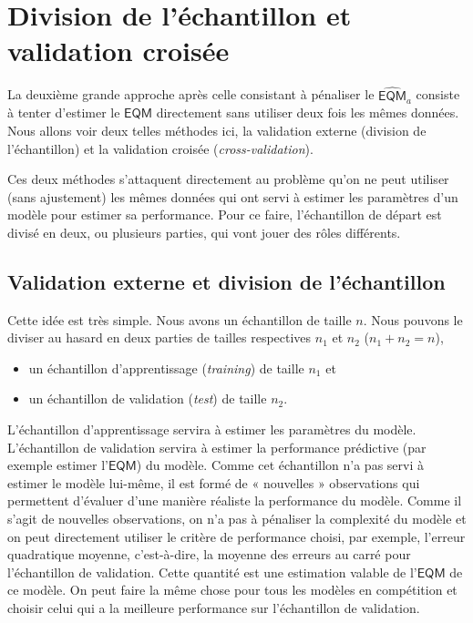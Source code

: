 \documentclass[
  11pt,
  letterpaper,
]{book}
\providecommand{\tightlist}{%
  \setlength{\itemsep}{0pt}\setlength{\parskip}{0pt}}
\theoremstyle{definition}
\theoremstyle{definition}
\theoremstyle{definition}
\theoremstyle{definition}
\theoremstyle{remark}
\begin{document}
\hypertarget{division-de-luxe9chantillon-et-validation-croisuxe9e}{%
\section{Division de l'échantillon et validation croisée}\label{division-de-luxe9chantillon-et-validation-croisuxe9e}}

La deuxième grande approche après celle consistant à pénaliser le \(\widehat{\mathsf{EQM}}_a\) consiste à tenter d'estimer le \(\mathsf{EQM}\) directement sans utiliser deux fois les mêmes données. Nous allons voir deux telles méthodes ici, la validation externe (division de l'échantillon) et la validation croisée (\emph{cross-validation}).

Ces deux méthodes s'attaquent directement au problème qu'on ne peut utiliser (sans ajustement) les mêmes données qui ont servi à estimer les paramètres d'un modèle pour estimer sa performance. Pour ce faire, l'échantillon de départ est divisé en deux, ou plusieurs parties, qui vont jouer des rôles différents.

\hypertarget{validation-externe-et-division-de-luxe9chantillon}{%
\subsection{Validation externe et division de l'échantillon}\label{validation-externe-et-division-de-luxe9chantillon}}

Cette idée est très simple. Nous avons un échantillon de taille \(n\). Nous pouvons le diviser au hasard en deux parties de tailles respectives \(n_1\) et \(n_2\) (\(n_1+n_2=n\)),

\begin{itemize}
\tightlist
\item
  un échantillon d'apprentissage (\emph{training}) de taille \(n_1\) et
\item
  un échantillon de validation (\emph{test}) de taille \(n_2\).
\end{itemize}

L'échantillon d'apprentissage servira à estimer les paramètres du modèle. L'échantillon de validation servira à estimer la performance prédictive (par exemple estimer l'\(\mathsf{EQM}\)) du modèle. Comme cet échantillon n'a pas servi à estimer le modèle lui-même, il est formé de « nouvelles » observations qui permettent d'évaluer d'une manière réaliste la performance du modèle. Comme il s'agit de nouvelles observations, on n'a pas à pénaliser la complexité du modèle et on peut directement utiliser le critère de performance choisi, par exemple, l'erreur quadratique moyenne, c'est-à-dire, la moyenne des erreurs au carré pour l'échantillon de validation. Cette quantité est une estimation valable de l'\(\mathsf{EQM}\) de ce modèle. On peut faire la même chose pour tous les modèles en compétition et choisir celui qui a la meilleure performance sur l'échantillon de validation.
\end{document}
